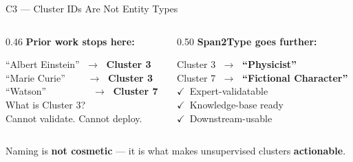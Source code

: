 \documentclass[aspectratio=169]{beamer}
\newcommand{\highlight}[1]{\textcolor{accent}{\textbf{#1}}}
\begin{document}
\begin{frame}{C3 --- Cluster IDs Are Not Entity Types}

  \begin{columns}[T]
    \begin{column}{0.46\textwidth}
      \textbf{\textcolor{bad}{Prior work stops here:}}
      \vspace{5pt}
      \begin{codebox}
        ``Albert Einstein'' $\;\to\;$ \textbf{Cluster 3}\\
        ``Marie Curie''\ \ \ \ $\;\to\;$ \textbf{Cluster 3}\\
        ``Watson''\ \ \ \ \ \ \ \ \ $\;\to\;$ \textbf{Cluster 7}\\[8pt]
        \textcolor{bad}{What is Cluster 3?}\\
        \textcolor{bad}{Cannot validate. Cannot deploy.}
      \end{codebox}
    \end{column}
    \begin{column}{0.50\textwidth}
      \textbf{\textcolor{good}{Span2Type goes further:}}
      \vspace{5pt}
      \begin{codebox}
        Cluster 3 $\;\to\;$ \textcolor{good}{\textbf{``Physicist''}}\\
        Cluster 7 $\;\to\;$ \textcolor{good}{\textbf{``Fictional Character''}}\\[8pt]
        \textcolor{good}{$\checkmark$\ Expert-validatable}\\
        \textcolor{good}{$\checkmark$\ Knowledge-base ready}\\
        \textcolor{good}{$\checkmark$\ Downstream-usable}
      \end{codebox}
    \end{column}
  \end{columns}
  \vspace{8pt}
  \begin{keybox}
    Naming is \highlight{not cosmetic} ---
    it is what makes unsupervised clusters \textbf{actionable}.
  \end{keybox}
\end{frame}
\end{document}
